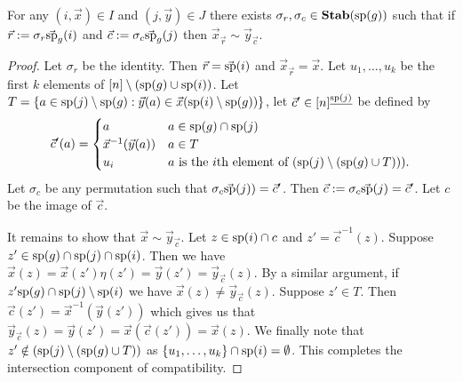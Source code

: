 \documentclass[../paper.tex]{subfiles}
\begin{document}
\begin{lem}
  \label{lem:permutation-row-column}
  For any $(i, \vec{x}) \in I$ and $(j, \vec{y}) \in J$ there exists $\sigma_r,
  \sigma_c \in \text{\textbf{Stab}} (\text{sp} (g))$ such that if $\vec{r} := \sigma_r \vec{\text{sp}}_g(i)$
  and $\vec{c} := \sigma_c \vec{\text{sp}}_g(j)$ then $\vec{x}_{\vec{r}} \sim
  \vec{y}_{\vec{c}}$.
\end{lem}
\begin{proof}
  Let $\sigma_r$ be the identity. Then $\vec{r} = \vec{\text{sp}}(i)$ and
  $\vec{x}_{\vec{r}} = \vec{x}$. Let $u_1, \ldots , u_k$ be the first $k$
  elements of $[n] \setminus (\text{sp}(g) \cup \text{sp}(i))$. Let $T = \{a \in
  \text{sp}(j) \setminus \text{sp}(g) : \vec{y}(a) \in \vec{x}(\text{sp}(i) \setminus
  \text{sp}(g))\}$, let $\vec{c}' \in [n]^{\underline{\text{sp}(j)}}$ be defined by
  \[
    \vec{c}' (a) =
    \begin{cases}
      a & a \in \text{sp}(g) \cap \text{sp}(j)\\
      \vec{x}^{-1}(\vec{y}(a)) & a \in T\\
      u_{i} & \text{$a$ is the $i$th element of $(\text{sp}(j) \setminus (\text{sp}(g)
        \cup T)))$}.
    \end{cases}
  \]
  Let $\sigma_c$ be any permutation such that $\sigma_c \vec{\text{sp}}(j)) =
  \vec{c}'$. Then $\vec{c} := \sigma_c \vec{\text{sp}}(j) = \vec{c}'$. Let $c$ be
  the image of $\vec{c}$.

  It remains to show that $\vec{x} \sim \vec{y}_{\vec{c}}$. Let $z \in \text{sp}(i)
  \cap c$ and $z' = \vec{c}^{-1}(z)$. Suppose $z' \in \text{sp}(g)\cap \text{sp}(j)
  \cap \text{sp}(i)$. Then we have $\vec{x}(z) = \vec{x}(z') \eta (z') =
  \vec{y}(z') = \vec{y}_{\vec{c}}(z)$. By a similar argument, if $z' \text{sp}(g)
  \cap \text{sp}(j) \setminus \text{sp}(i)$ we have $\vec{x}(z) \neq
  \vec{y}_{\vec{c}}(z)$. Suppose $z' \in T$. Then $\vec{c}(z') =
  \vec{x}^{-1}(\vec{y}(z'))$ which gives us that $\vec{y}_{\vec{c}}(z) =
  \vec{y}(z') = \vec{x}(\vec{c}(z')) = \vec{x}(z)$. We finally note that $z'
  \notin (\text{sp}(j) \setminus (\text{sp}(g) \cup T))$ as $\{u_1 , \ldots , u_k\}
  \cap \text{sp}(i) = \emptyset$. This completes the intersection component of
  compatibility.


\end{proof}
\end{document}
